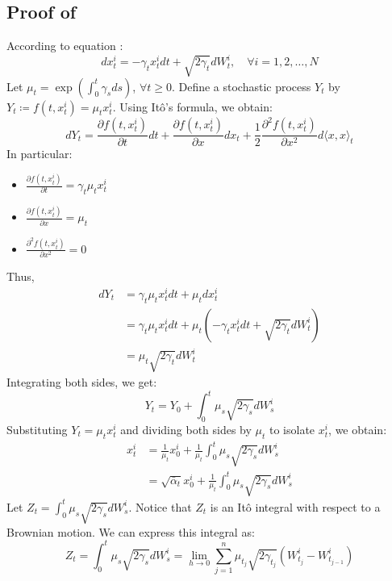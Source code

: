 \documentclass[a4paper,10pt]{article}
\theoremstyle{definition} %
\theoremstyle{definition} %
\theoremstyle{definition} %
\theoremstyle{definition} %
\newcommand{\0}{\boldsymbol{0}}
\begin{document}
\subsection{Proof of } \label{sec:proof_solution_processus_direct}
According to equation :
\begin{equation*}
dx_t^i = -\gamma_t x_t^i dt + \sqrt{2\gamma_t} dW_t^i, \quad \forall i=1,2,\dots,N
\end{equation*}
Let $\mu_t = \exp\left(\int_0^t \gamma_s ds\right)$, $\forall t \geq 0$.
Define a stochastic process $Y_t$ by $Y_t \coloneqq f(t, x_t^i) = \mu_t x_t^i$.
Using Itô's formula, we obtain:
\begin{equation*}
dY_t = \frac{\partial f(t, x_t^i)}{\partial t} dt + \frac{\partial f(t, x_t^i)}{\partial x} dx_t + \frac{1}{2} \frac{\partial^2 f(t, x_t^i)}{\partial x^2} d\langle x, x \rangle_t
\end{equation*}
In particular:
\begin{itemize}
    \item[] $\frac{\partial f(t, x_t^i)}{\partial t} = \gamma_t \mu_t x_t^i$
    \item[] $\frac{\partial f(t, x_t^i)}{\partial x} = \mu_t$
    \item[] $\frac{\partial^2 f(t, x_t^i)}{\partial x^2} = 0$
\end{itemize}
Thus,
\begin{align*}
dY_t &= \gamma_t \mu_t x_t^i dt + \mu_t dx_t^i \\
&= \gamma_t \mu_t x_t^i dt + \mu_t \left(-\gamma_t x_t^i dt + \sqrt{2\gamma_t} dW_t^i\right) \\
&= \mu_t \sqrt{2\gamma_t} dW_t^i
\end{align*}
Integrating both sides, we get:
\begin{equation*}
Y_t = Y_0 + \int_0^t \mu_s \sqrt{2\gamma_s} dW_s^i
\end{equation*}
Substituting $Y_t = \mu_t x_t^i$ and dividing both sides by $\mu_t$ to isolate $x_t^i$, we obtain:
\begin{align*}
x_t^i &= \frac{1}{\mu_t} x_0^i + \frac{1}{\mu_t} \int_0^t \mu_s \sqrt{2\gamma_s} dW_s^i \\
&= \sqrt{\bar{\alpha}_t} x_0^i + \frac{1}{\mu_t} \int_0^t \mu_s \sqrt{2\gamma_s} dW_s^i
\end{align*}
Let $Z_t = \int_0^t \mu_s \sqrt{2\gamma_s} dW_s^i$. Notice that $Z_t$ is an Itô integral with respect to a Brownian motion. We can express this integral as:
\begin{equation*}
Z_t = \int_0^t \mu_s \sqrt{2\gamma_s} dW_s^i = \lim_{h \to 0} \sum_{j=1}^n \mu_{t_j} \sqrt{2\gamma_{t_j}} (W_{t_j}^i - W_{t_{j-1}}^i)
\end{equation*}
\end{document}
